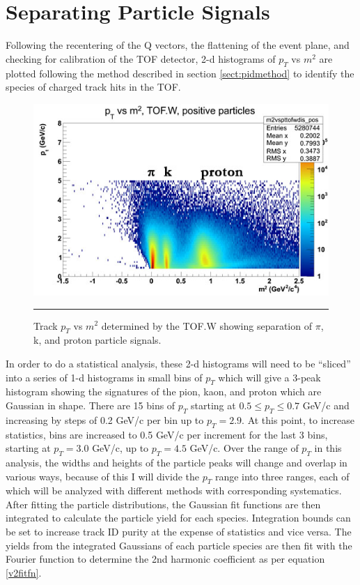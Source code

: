 \section{Separating Particle Signals}
Following the recentering of the Q vectors, the flattening of the event plane, and checking for calibration of the TOF detector, 2-d histograms of $p_T$ vs $m^2$ are plotted following the method described in section \ref{sect:pidmethod} to identify the species of charged track hits in the TOF. 
\begin{figure}[htbp!]
  \centering
    \includegraphics[width=1\textwidth]{Figures/ptvsm2tof.jpg}
    \rule{35em}{0.5pt}
  \caption[Track $p_T$ vs $m^2$ determined by the TOF.W showing separation of $\pi$, k, and proton particle signals.]{Track $p_T$ vs $m^2$ determined by the TOF.W showing separation of $\pi$, k, and proton particle signals.}
  \label{fig:accspread}
\end{figure}

In order to do a statistical analysis, these 2-d histograms will need to be ``sliced'' into a series of 1-d histograms in small bins of $p_T$ which will give a 3-peak histogram showing the signatures of the pion, kaon, and proton which are Gaussian in shape. There are 15 bins of $p_T$ starting at $0.5 \leq p_T \leq 0.7$ GeV/c and increasing by steps of 0.2 GeV/c per bin up to $p_T = 2.9$. At this point, to increase statistics, bins are increased to 0.5 GeV/c per increment for the last 3 bins, starting at $p_T = 3.0$ GeV/c, up to $p_T = 4.5 $ GeV/c. Over the range of $p_T$ in this analysis, the widths and heights of the particle peaks will change and overlap in various ways, because of this I will divide the $p_T$ range into three ranges, each of which will be analyzed with different methods with corresponding systematics. After fitting the particle distributions, the Gaussian fit functions are then integrated to calculate the particle yield for each species. Integration bounds can be set to increase track ID purity at the expense of statistics and vice versa. The yields from the integrated Gaussians of each particle species are then fit with the Fourier function to determine the 2nd harmonic coefficient as per equation \ref{v2fitfn}. 

